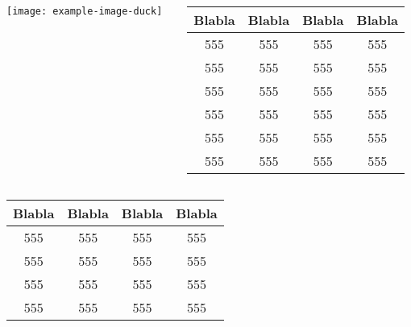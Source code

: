 \documentclass{beamer}
\begin{document}
\begin{frame}

\scriptsize
\begin{columns}[onlytextwidth]
    \begin{column}{.48\textwidth}
        \texttt{[image: example-image-duck]}
    \end{column}
    \begin{column}{.48\textwidth}
      \begin{tabular}{|c|c|c|c|}
            \hline
            \textbf{Blabla}       & \textbf{Blabla}             & \textbf{Blabla}          & \textbf{Blabla}          \\ \hline
            555 & 555 & 555 & 555 \\ \hline
            555 & 555 & 555 & 555 \\ \hline
            555                        & 555                        & 555                        & 555                        \\ \hline
            555                        & 555                        & 555                        & 555                        \\ \hline
            555                        & 555                        & 555                        & 555                        \\ \hline
            555                        & 555 & 555                        & 555                        \\ \hline
        \end{tabular}
    \end{column}
\end{columns}
\bigskip
\begin{columns}[onlytextwidth]
    \begin{column}{.48\textwidth}
      \begin{tabular}{|c|c|c|c|}
            \hline
            \textbf{Blabla}       & \textbf{Blabla}             & \textbf{Blabla}          & \textbf{Blabla}          \\ \hline
            555 & 555 & 555 & 555 \\ \hline
            555 & 555 & 555 & 555 \\ \hline
            555                        & 555                        & 555                        & 555                        \\ \hline
            555                        & 555                        & 555                        & 555                        \\ \hline

\end{tabular}
\end{column}
\end{columns}
\end{frame}
\end{document}
